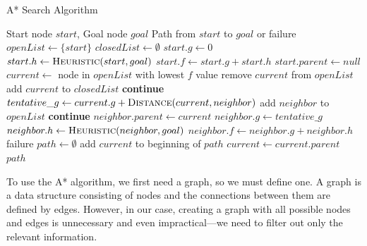 \algrenewcommand{}
\algrenewcommand{}
\renewcommand{\alglinenumber}[1]{#1.}

\begin{algorithm}
\caption{A* Search Algorithm}\label{alg:AStar}
\begin{algorithmic}[1]
\Require Start node $start$, Goal node $goal$
\Ensure Path from $start$ to $goal$ or failure
\Statex
{}
    \State $openList \gets \{start\}$
    \State $closedList \gets \emptyset$
    \State $start.g \gets 0$
    \State $start.h \gets \Call{Heuristic}{start, goal}$
    \State $start.f \gets start.g + start.h$
    \State $start.parent \gets null$
        \State $current \gets$ node in $openList$ with lowest $f$ value
            \State \Return {}
        \EndIf
        \State remove $current$ from $openList$
        \State add $current$ to $closedList$
                \State \textbf{continue}
            \EndIf
            \State $tentative\_g \gets current.g + \Call{Distance}{current, neighbor}$
                \State add $neighbor$ to $openList$
                \State \textbf{continue}
            \EndIf
            \State $neighbor.parent \gets current$
            \State $neighbor.g \gets tentative\_g$
            \State $neighbor.h \gets \Call{Heuristic}{neighbor, goal}$
            \State $neighbor.f \gets neighbor.g + neighbor.h$
        \EndFor
    \EndWhile
    \State \Return failure
\EndFunction
\Statex
{}
    \State $path \gets \emptyset$
        \State add $current$ to beginning of $path$
        \State $current \gets current.parent$
    \EndWhile
    \State \Return $path$
\EndFunction
\end{algorithmic}
\end{algorithm}

To use the A* algorithm, we first need a graph, so we must define one. A graph is a data structure consisting of nodes and the connections between them are defined by edges. However, in our case, creating a graph with all possible nodes and edges is unnecessary and even impractical—we need to filter out only the relevant information.

